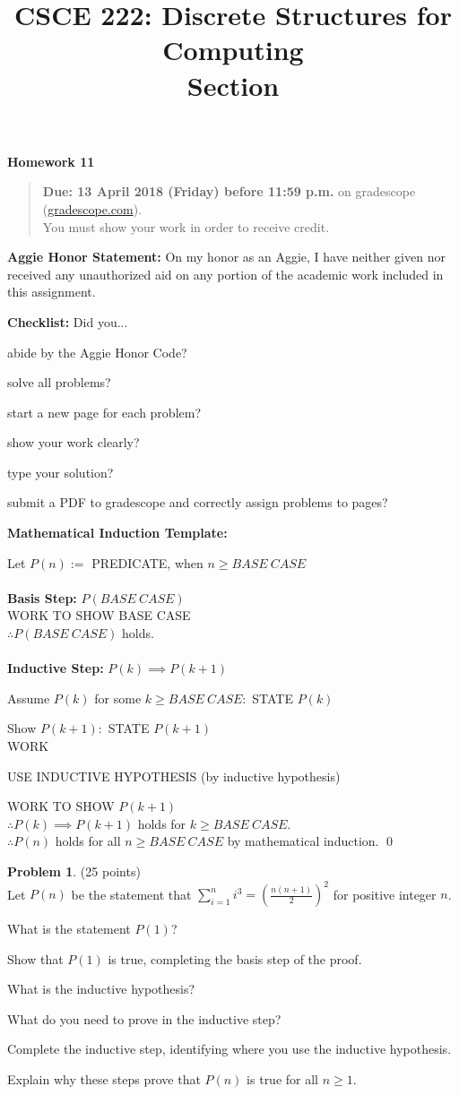 \documentclass{article}
\title{CSCE 222: Discrete Structures for Computing\\Section \mysectionnumber\\\mysemester}
\author{\myname}
\date{}
\theoremstyle{definition}
\newtheorem{problem}{Problem}
\newcommand{\honor}{\noindent \textbf{Aggie Honor Statement: }On my honor as an Aggie, I have neither
  given nor received any unauthorized aid on any portion of the academic work included in this assignment.
}
\newcommand{\checklist}{\noindent\textbf{Checklist:}
Did you...
\begin{compactenum}
\item abide by the Aggie Honor Code?
\item solve all problems?
\item start a new page for each problem?
\item show your work clearly?
\item type your solution?
\item submit a PDF to gradescope and correctly assign problems to pages?
\end{compactenum}
}
\newcommand{\problemset}[1]{\begin{center}\textbf{Homework #1}\end{center}}
\newcommand{\duedate}[1]{\begin{quote}\textbf{Due: #1} on gradescope (\url{gradescope.com}). \\You must show your work in order to receive credit.\end{quote}}
\newcommand{\homeworknumber}[0]{11}
\begin{document}
\maketitle
\problemset{\homeworknumber}
\duedate{13 April 2018 (Friday) before 11:59 p.m.}
\bigskip

\honor
\bigskip

\checklist
\bigskip

\noindent
\textbf{Mathematical Induction Template:}

\noindent
Let $P(n):=$ PREDICATE, when $n\geq BASE\ CASE$\\
\\
\textbf{Basis Step:} $P(BASE\ CASE)$ \\

WORK TO SHOW BASE CASE\\

$\therefore  P(BASE\ CASE)$ holds.\\
\\
\textbf{Inductive Step:} $P(k)\implies P(k+1)$

Assume $P(k)$ for some $k\geq BASE\ CASE:$ STATE $P(k)$

Show $P(k+1):$ STATE $P(k+1)$\\

WORK

USE INDUCTIVE HYPOTHESIS \hfill (by inductive hypothesis)

WORK TO SHOW $P(k+1)$\\

$\therefore  P(k)\implies P(k+1)$ holds for $k \geq BASE\ CASE$.\\

\noindent
$\therefore P(n)$ holds for all $n \geq BASE\ CASE$ by mathematical induction. \qed

\newpage

\begin{problem} (25 points)\\
Let $P(n)$ be the statement that $\displaystyle \sum_{i=1}^n i^3=\left(\frac{n(n+1)}{2}\right)^2$ for positive integer $n$.
\begin{compactenum}
\renewcommand{\theenumi}{\alph{enumi}}
\item What is the statement $P(1)$?
\item Show that $P(1)$ is true, completing the basis step of the proof.
\item What is the inductive hypothesis?
\item What do you need to prove in the inductive step?
\item Complete the inductive step, identifying where you use the inductive hypothesis.
\item Explain why these steps prove that $P(n)$ is true for all $n\geq 1$.
\end{compactenum}
\end{problem}
\end{document}
